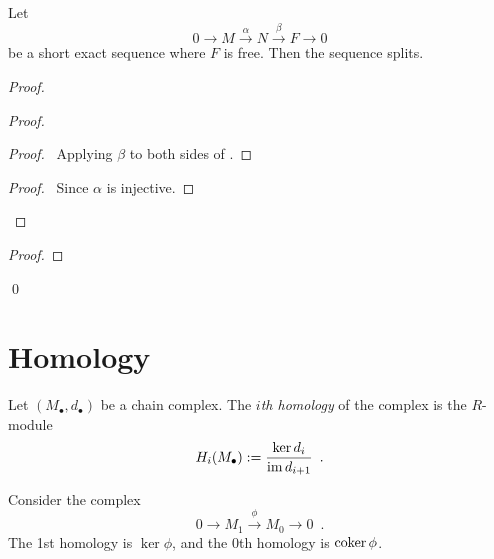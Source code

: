\begin{prop}
Let
\[ 0 \rightarrow M \stackrel{\alpha}{\rightarrow} N \stackrel{\beta}{\rightarrow} F \rightarrow 0 \]
be a short exact sequence where $F$ is free. Then the sequence splits.
\end{prop}

\begin{proof}
\pf
{}
\begin{proof}
	\begin{proof}
		\pf\ Applying $\beta$ to both sides of .
	\end{proof}
	\begin{proof}
		\pf\ Since $\alpha$ is injective. 
	\end{proof}
\end{proof}
\begin{proof}
\end{proof}
\qed
\end{proof}

\chapter{Homology}

\begin{df}[Homology]
Let $(M_\bullet, d_\bullet)$ be a chain complex.
The \emph{$i$th homology} of the complex is the $R$-module
\[ H_i(M_\bullet) := \frac{\ker d_i}{\operatorname{im} d_{i+1}} \enspace . \]
\end{df}

\begin{prop}
Consider the complex
\[ 0 \rightarrow M_1 \stackrel{\phi}{\rightarrow} M_0 \rightarrow 0 \enspace . \]
The 1st homology is $\ker \phi$, and the 0th homology is $\operatorname{coker} \phi$.
\end{prop}

